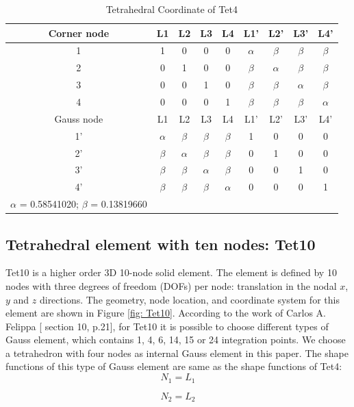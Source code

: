 \begin{table}
	\centering
	\caption{Tetrahedral Coordinate of Tet4} \label{tab: Tet4}
	\begin{tabular}{ccccccccc}			
		\hline
		Corner node\centering& L1& L2& L3& L4& L1'& L2'& L3'& L4'\\ \hline
		1\centering& 1& 0& 0& 0& $\alpha$& $\beta$& $\beta$& $\beta$\\
		2\centering& 0& 1& 0& 0& $\beta$& $\alpha$& $\beta$& $\beta$\\
		3\centering& 0& 0& 1& 0& $\beta$& $\beta$& $\alpha$& $\beta$\\
		4\centering& 0& 0& 0& 1& $\beta$& $\beta$& $\beta$& $\alpha$\\
		\hline
		Gauss node\centering& L1& L2& L3& L4& L1'& L2'& L3'& L4' \\ \hline
		1'\centering& $\alpha$& $\beta$& $\beta$& $\beta$& 1& 0& 0& 0  \\
		2'\centering&$\beta$ & $\alpha$& $\beta$& $\beta$& 0& 1& 0& 0 \\
		3'\centering& $\beta$& $\beta$& $\alpha$& $\beta$& 0& 0& 1& 0\\
		4'\centering& $\beta$& $\beta$& $\beta$& $\alpha$& 0& 0& 0& 1\\
		\hline
		$\alpha$ = 0.58541020; $\beta$ = 0.13819660&&&&&&&&\\
		\hline 		    
	\end{tabular}	
\end{table}		

\subsection{Tetrahedral element with ten nodes: Tet10}
Tet10 is a higher order 3D 10-node solid element. The element is defined by 10 nodes with three degrees of freedom (DOFs) per node: translation in the nodal $x$, $y$ and $z$ directions. The geometry, node location, and coordinate system for this element are shown in Figure \ref{fig: Tet10}. According to the work of Carlos A. Felippa [\cite{Felippa} section 10, p.21], for Tet10 it is possible to choose different types of Gauss element, which contains 1, 4, 6, 14, 15 or 24 integration points. We choose a tetrahedron with four nodes as internal Gauss element in this paper. The shape functions of this type of Gauss element are same as the shape functions of Tet4:
\begin{equation}
N_1 = L_1
\end{equation}

\begin{equation}
N_2 = L_2
\end{equation}

